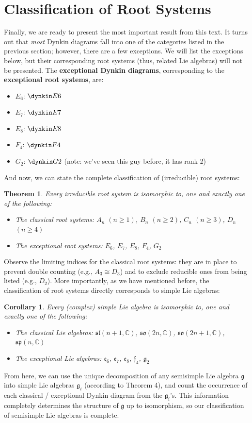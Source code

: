 \documentclass{article}
\newtheorem{theorem}{Theorem}
\newtheorem{corollary}{Corollary}[theorem]
\theoremstyle{definition}
\begin{document}
\section{Classification of Root Systems}
Finally, we are ready to present the most important result from this text. It turns out that \textit{most} Dynkin diagrams fall into one of the categories listed in the previous section; however, there are a few exceptions. We will list the exceptions below, but their corresponding root systems (thus, related Lie algebras) will not be presented. The \textbf{exceptional Dynkin diagrams}, corresponding to the \textbf{exceptional root systems}, are: 
\begin{itemize}
    \item $E_6$: $\dynkin E6$
    \item $E_7$: $\dynkin E7$
    \item $E_8$: $\dynkin E8$\\
    \item $F_4$: $\dynkin F4$\\
    \item $G_2$: $\dynkin G2$ (note: we've seen this guy before, it has rank 2)
\end{itemize}
And now, we can state the complete classification of (irreducible) root systems: 
\begin{theorem}
Every irreducible root system is isomorphic to, one and exactly one of the following:
\begin{itemize}
    \item The classical root systems: $A_n$ $(n\geq1)$, $B_n$ $(n\geq2)$, $C_n$ $(n\geq3)$, $D_n$ $(n\geq4)$
    \item The exceptional root systems: $E_6$, $E_7$, $E_8$, $F_4$, $G_2$
\end{itemize}
\end{theorem}
Observe the limiting indices for the classical root systems: they are in place to prevent double counting (e.g., $A_3\cong D_3$) and to exclude reducible ones from being listed (e.g., $D_2$). More importantly, as we have mentioned before, the classification of root systems directly corresponds to simple Lie algebras: 
\begin{corollary}
Every (complex) simple Lie algebra is isomorphic to, one and exactly one of the following:
\begin{itemize}
    \item The classical Lie algebras: $\mathfrak{sl}(n+1,\mathbb{C})$, $\mathfrak{so}(2n,\mathbb{C})$, $\mathfrak{so}(2n+1,\mathbb{C})$, $\mathfrak{sp}(n,\mathbb{C})$
    \item The exceptional Lie algebras: $\mathfrak{e}_6$, $\mathfrak{e}_7$, $\mathfrak{e}_8$, $\mathfrak{f}_4$, $\mathfrak{g}_2$
\end{itemize}
\end{corollary}
From here, we can use the unique decomposition of any semisimple Lie algebra $\mathfrak{g}$ into simple Lie algebras $\mathfrak{g}_i$ (according to Theorem 4), and count the occurrence of each classical / exceptional Dynkin diagram from the $\mathfrak{g}_i$'s. This information completely determines the structure of $\mathfrak{g}$ up to isomorphism, so our classification of semisimple Lie algebras is complete. 
\end{document}

